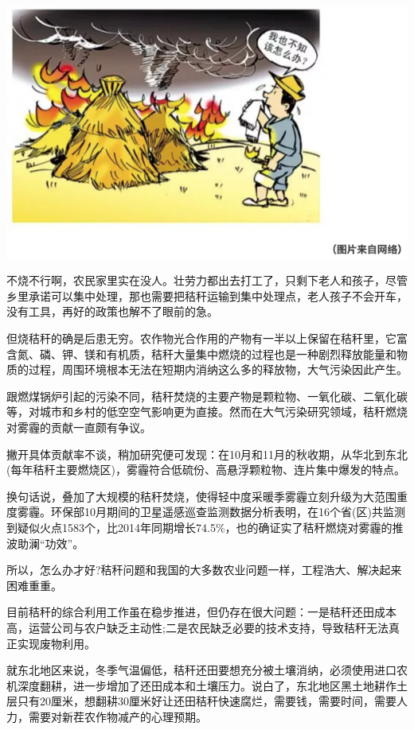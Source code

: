 \documentclass[]{book}
\begin{document}
\includegraphics[width=8.33in]{images/stalk2}

不烧不行啊，农民家里实在没人。壮劳力都出去打工了，只剩下老人和孩子，尽管乡里承诺可以集中处理，那也需要把秸秆运输到集中处理点，老人孩子不会开车，没有工具，再好的政策也解不了眼前的急。

但烧秸秆的确是后患无穷。农作物光合作用的产物有一半以上保留在秸秆里，它富含氮、磷、钾、镁和有机质，秸秆大量集中燃烧的过程也是一种剧烈释放能量和物质的过程，周围环境根本无法在短期内消纳这么多的释放物，大气污染因此产生。

跟燃煤锅炉引起的污染不同，秸秆焚烧的主要产物是颗粒物、一氧化碳、二氧化碳等，对城市和乡村的低空空气影响更为直接。然而在大气污染研究领域，秸秆燃烧对雾霾的贡献一直颇有争议。

撇开具体贡献率不谈，稍加研究便可发现：在10月和11月的秋收期，从华北到东北(每年秸秆主要燃烧区)，雾霾符合低硫份、高悬浮颗粒物、连片集中爆发的特点。

换句话说，叠加了大规模的秸秆焚烧，使得轻中度采暖季雾霾立刻升级为大范围重度雾霾。环保部10月期间的卫星遥感巡查监测数据分析表明，在16个省(区)共监测到疑似火点1583个，比2014年同期增长74.5\%，也的确证实了秸秆燃烧对雾霾的推波助澜``功效''。

所以，怎么办才好?秸秆问题和我国的大多数农业问题一样，工程浩大、解决起来困难重重。

目前秸秆的综合利用工作虽在稳步推进，但仍存在很大问题：一是秸秆还田成本高，运营公司与农户缺乏主动性;二是农民缺乏必要的技术支持，导致秸秆无法真正实现废物利用。

就东北地区来说，冬季气温偏低，秸秆还田要想充分被土壤消纳，必须使用进口农机深度翻耕，进一步增加了还田成本和土壤压力。说白了，东北地区黑土地耕作土层只有20厘米，想翻耕30厘米好让还田秸秆快速腐烂，需要钱，需要时间，需要人力，需要对新茬农作物减产的心理预期。
\end{document}
